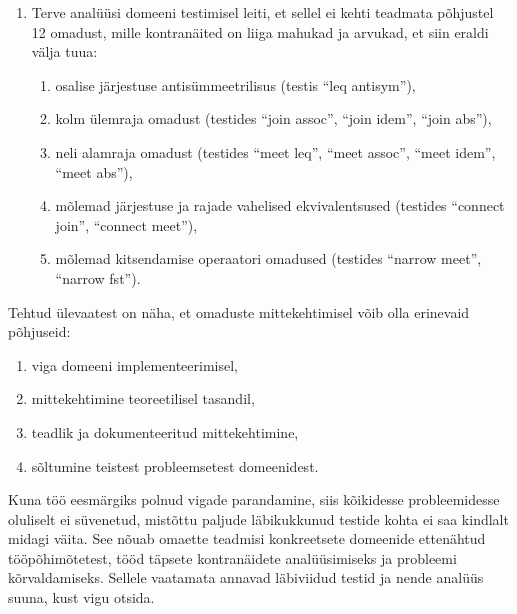 \documentclass[../thesis.tex]{subfiles}
\begin{document}
\begin{enumerate}
	\item Terve analüüsi domeeni testimisel leiti, et sellel ei kehti teadmata põhjustel 12 omadust, mille kontranäited on liiga mahukad ja arvukad, et siin eraldi välja tuua:
	\begin{enumerate}[nosep]
		\item osalise järjestuse antisümmeetrilisus (testis \enquote{leq antisym}),
		\item kolm ülemraja omadust (testides \enquote{join assoc}, \enquote{join idem}, \enquote{join abs}),
		\item neli alamraja omadust (testides \enquote{meet leq}, \enquote{meet assoc}, \enquote{meet idem}, \enquote{meet abs}),
		\item mõlemad järjestuse ja rajade vahelised ekvivalentsused (testides \enquote{connect join}, \enquote{connect meet}),
		\item mõlemad kitsendamise operaatori omadused (testides \enquote{narrow meet}, \enquote{narrow fst}).
	\end{enumerate}
\end{enumerate}
Tehtud ülevaatest on näha, et omaduste mittekehtimisel võib olla erinevaid põhjuseid:
\begin{enumerate}[nosep]
	\item viga domeeni implementeerimisel,
	\item mittekehtimine teoreetilisel tasandil,
	\item teadlik ja dokumenteeritud mittekehtimine,
	\item sõltumine teistest probleemsetest domeenidest.
\end{enumerate}
Kuna töö eesmärgiks polnud vigade parandamine, siis kõikidesse probleemidesse oluliselt ei süvenetud, mistõttu paljude läbikukkunud testide kohta ei saa kindlalt midagi väita. See nõuab omaette teadmisi konkreetsete domeenide ettenähtud tööpõhimõtetest, tööd täpsete kontranäidete analüüsimiseks ja probleemi kõrvaldamiseks. Sellele vaatamata annavad läbiviidud testid ja nende analüüs suuna, kust vigu otsida.
\end{document}

